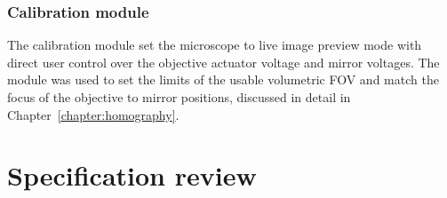 %
%

\subsubsection{Calibration module}

The calibration module set the microscope to live image preview mode with direct user control over the objective actuator voltage and mirror voltages.
The module was used to set the limits of the usable volumetric FOV and match the focus of the objective to mirror positions, discussed in detail in Chapter~\ref{chapter:homography}.

\section{Specification review}

